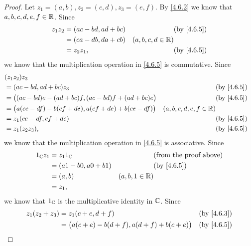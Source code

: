 \begin{proof}
  Let \(z_1 = (a, b), z_2 = (c, d), z_3 = (e, f)\).
  By \cref{4.6.2} we know that \(a, b, c, d, e, f \in \mathbb{R}\).
  Since
  \begin{align*}
    z_1 z_2 & = (ac - bd, ad + bc) &                     & \by{4.6.5} \\
            & = (ca - db, da + cb) & (a, b, c, d \in \R)              \\
            & = z_2 z_1,           &                     & \by{4.6.5}
  \end{align*}
  we know that the multiplication operation in \cref{4.6.5} is commutative.
  Since
  \begin{align*}
     & (z_1 z_2) z_3                                                                                             \\
     & = (ac - bd, ad + bc) z_3                                         &                           & \by{4.6.5} \\
     & = \big((ac - bd) e - (ad + bc) f, (ac - bd) f + (ad + bc) e\big) &                           & \by{4.6.5} \\
     & = \big(a (ce - df) - b (cf + de), a (cf + de) + b (ce - df)\big) & (a, b, c, d, e, f \in \R)              \\
     & = z_1 (ce - df, cf + de)                                         &                           & \by{4.6.5} \\
     & = z_1 (z_2 z_3),                                                 &                           & \by{4.6.5}
  \end{align*}
  we know that the multiplication operation in \cref{4.6.5} is associative.
  Since
  \begin{align*}
    1_{\C} z_1 & = z_1 1_{\C}             &                  & \text{(from the proof above)} \\
               & = (a 1 - b 0, a 0 + b 1) &                  & \by{4.6.5}                    \\
               & = (a, b)                 & (a, b, 1 \in \R)                                 \\
               & = z_1,
  \end{align*}
  we know that \(1_{\mathbb{C}}\) is the multiplicative identity in \(\mathbb{C}\).
  Since
  \begin{align*}
    z_1 (z_2 + z_3) & = z_1 (c + e, d + f)                                      &                           & \by{4.6.3} \\
                    & = \big(a (c + e) - b (d + f), a (d + f) + b (c + e)\big)  &                           & \by{4.6.5} \\

\end{align*}
\end{proof}
